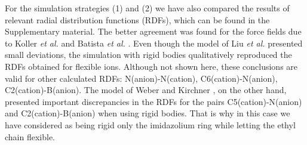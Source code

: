 \documentclass[3p,twocolumn]{elsarticle}
\begin{document}
For the simulation strategies (1) and (2) we have also compared the results of relevant radial distribution functions (RDFs), which can be found in the Supplementary material. The better agreement was found for the force fields due to Koller \textit{et al.} \cite{Koller_2012} and Batista \textit{et al.} \cite{Batista_2015}. Even though the model of Liu \textit{et al.} \cite{Liu_2014} presented small deviations, the simulation with rigid bodies qualitatively reproduced the RDFs obtained for flexible ions. Although not shown here, these conclusions are valid for other calculated RDFs: N(anion)-N(cation), C6(cation)-N(anion), C2(cation)-B(anion). The model of Weber and Kirchner \cite{Weber_2016}, 
on the other hand, presented important discrepancies in the RDFs for the pairs C5(cation)-N(anion) and C2(cation)-B(anion) when using rigid bodies. That is why in this case we have considered as being rigid only the imidazolium ring while letting  the ethyl chain flexible. 
\end{document}
